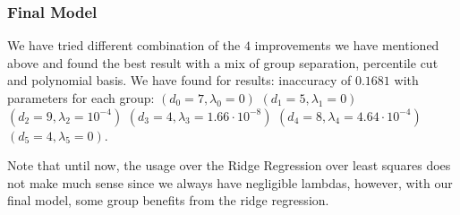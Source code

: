 \documentclass[10pt,conference,compsocconf]{IEEEtran}
\begin{document}
\subsubsection{Final Model}
We have  tried different combination of the $4$ improvements we have mentioned above and found
the best result with a mix of group separation, percentile cut and polynomial
basis. We have found for results: inaccuracy of $0.1681$ with parameters for each group:
$(d_0 = 7, \lambda_0 = 0)$
$(d_1 = 5, \lambda_1 = 0)$
$(d_2 = 9, \lambda_2 = 10^{-4})$
$(d_3 = 4, \lambda_3 = 1.66 \cdot 10^{-8})$
$(d_4 = 8, \lambda_4 = 4.64 \cdot 10^{-4})$
$(d_5 = 4, \lambda_5 = 0)$.

Note that until now, the usage over the Ridge Regression over least squares does
not make much sense since we always have negligible lambdas, however, with our
final model, some group benefits from the ridge regression.
\end{document}
